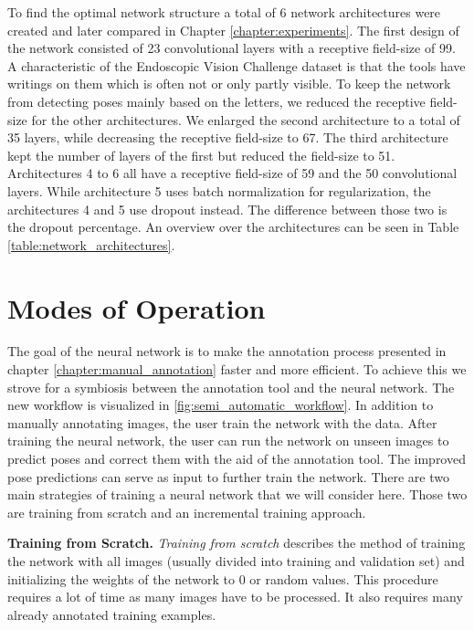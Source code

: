To find the optimal network structure a total of 6 network architectures were created and later compared in Chapter \ref{chapter:experiments}. The first design of the network consisted of 23 convolutional layers with a receptive field-size of 99. A characteristic of the Endoscopic Vision Challenge dataset is that the tools have writings on them which is often not or only partly visible. To keep the network from detecting poses mainly based on the letters, we reduced the receptive field-size for the other architectures. We enlarged the second architecture to a total of 35 layers, while decreasing the receptive field-size to 67. The third architecture kept the number of layers of the first but reduced the field-size to 51. Architectures 4 to 6 all have a receptive field-size of 59 and the 50 convolutional layers. While architecture 5 uses batch normalization for regularization, the architectures 4 and 5 use dropout instead. The difference between those two is the dropout percentage. An overview over the architectures can be seen in Table \ref{table:network_architectures}.

\section{Modes of Operation} \label{section:modes_of_operation}

The goal of the neural network is to make the annotation process presented in chapter \ref{chapter:manual_annotation} faster and more efficient. To achieve this we strove for a symbiosis between the annotation tool and the neural network. The new workflow is visualized in \fig \ref{fig:semi_automatic_workflow}. In addition to manually annotating images, the user train the network with the data. After training the neural network, the user can run the network on unseen images to predict poses and correct them with the aid of the annotation tool. The improved pose predictions can serve as input to further train the network. There are two main strategies of training a neural network that we will consider here. Those two are training from scratch and an incremental training approach.

\noindent\textbf{Training from Scratch.} \textit{Training from scratch} describes the method of training the network with all images (usually divided into training and validation set) and initializing  the weights of the network to 0 or random values. This procedure requires a lot of time as many images have to be processed. It also requires many already annotated training examples.

